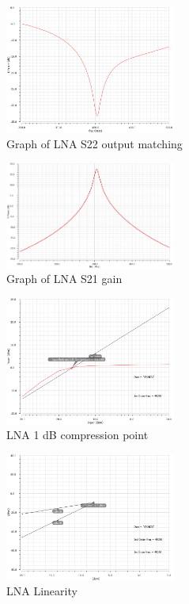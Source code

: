 \begin{figure}[H]
   \centering
    \includegraphics[width=0.5\textwidth]{figures/s22.png}
    \caption{Graph of LNA S22 output matching}
    \label{fig:s22}
\end{figure}

\begin{figure}[H]
   \centering
    \includegraphics[width=0.5\textwidth]{figures/s21.png}
    \caption{Graph of LNA S21 gain}
    \label{fig:s21}
\end{figure}

\begin{figure}[H]
   \centering
    \includegraphics[width=0.5\textwidth]{figures/lna1db.png}
    \caption{LNA 1 dB compression point}
    \label{fig:lna1db}
\end{figure}

\begin{figure}[H]
   \centering
    \includegraphics[width=0.5\textwidth]{figures/lnaiip3.png}
    \caption{LNA Linearity}
    \label{fig:lnaiip3}
\end{figure}

